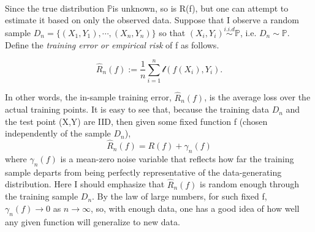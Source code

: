 \documentclass{article}
\def\bP{\ensuremath{\mathbb{P}}}
\theoremstyle{plain}
\renewcommand{\hat}[1]{\widehat{#1}}
\begin{document}
 \paragraph{} Since the true distribution \bP is unknown, so is R(f), but one can attempt to estimate it based on only the 
 observed data. Suppose that I observe a random sample $D_n = \lbrace(X_1, Y_1), \cdots,  (X_n, Y_n) \rbrace$ so that 
 $(X_i, Y_i) \stackrel{i.i.d}{\sim} \bP$, i.e. $D_n \sim \bP$. Define the \textit{training error or empirical risk} of 
 f as follows.
 \begin{defintion}
 \begin{equation}\hat{R}_{n}(f):=  \dfrac{1}{n} \sum_{i=1}^{n} \mathcal{l}(f(X_i),Y_i).
\end{equation}

 \end{defintion}
 In other words, the in-sample training error, $\hat{R}_n(f)$, is the average loss over the actual training points. 
It is easy to see that, because the training data $D_n$ and the test point (X,Y) are IID, then given some fixed function f (chosen 
independently of the sample $D_n$), 
\begin{equation}
\hat{R}_n(f) = R(f) + \gamma_n(f)
\end{equation}
where $\gamma_n(f)$ is a mean-zero noise variable that reflects how far the training sample departs from being perfectly representative of the data-generating distribution.  Here I should emphasize that $\hat{R}_n(f)$ is random enough through the training sample 
$D_n$. By the law of large numbers, for such fixed f, $\gamma_n(f) \rightarrow 0$ as $n \rightarrow \infty$, so, with enough data,
one has a good idea of how well any given function will generalize to new data.
\end{document}
